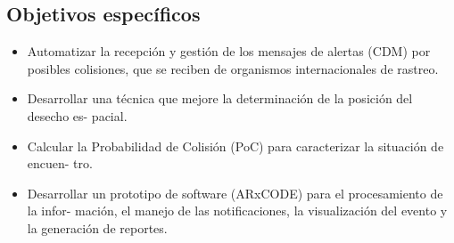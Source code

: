 \subsection*{Objetivos espec\'ificos}
\begin{itemize}
\item Automatizar la recepci\'on y gesti\'on de los mensajes de alertas (CDM) por posibles
colisiones, que se reciben de organismos internacionales de rastreo.
\item Desarrollar una t\'ecnica que mejore la determinaci\'on de la posici\'on del desecho es-
pacial.
\item Calcular la Probabilidad de Colisi\'on (PoC) para caracterizar la situaci\'on de encuen-
tro.
\item Desarrollar un prototipo de software (ARxCODE) para el procesamiento de la infor-
maci\'on, el manejo de las notificaciones, la visualizaci\'on del evento y la generaci\'on
de reportes.
\end{itemize}